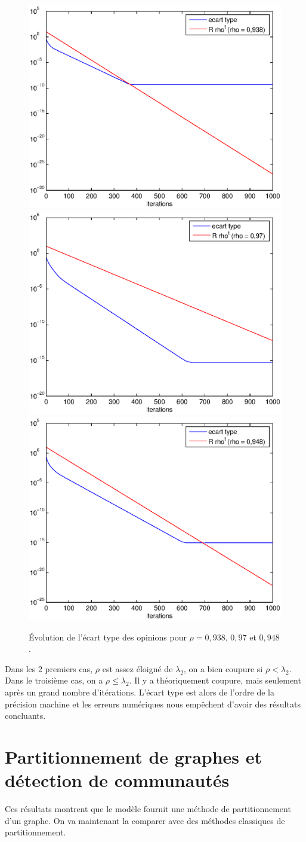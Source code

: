 \documentclass[12pt]{article}
\begin{document}
\begin{figure}[htb]
	\begin{center}
		\includegraphics[width=.4\textwidth]{var_rho_0938}
		\includegraphics[width=.4\textwidth]{var_rho_097}
		\includegraphics[width=.5\textwidth]{var_rho_0948}
		\caption{Évolution de l'écart type des opinions pour
                  $\rho = 0,938$, $0,97$ et $0,948$.}
		\label{num_coupure}
	\end{center}
\end{figure}

Dans les 2 premiers cas, $\rho$ est assez éloigné de $\lambda_2$, on a
bien coupure si $\rho < \lambda_2$.  Dans le troisième cas, on a $\rho
\leq \lambda_2$. Il y a théoriquement coupure, mais seulement après un
grand nombre d'itérations. L'écart type est alors de l'ordre de la
précision machine et les erreurs numériques nous empêchent d'avoir des
résultats concluants.

\section{Partitionnement de graphes et détection de communautés}
Ces résultats montrent que le modèle fournit une méthode de
partitionnement d'un graphe. On va maintenant la comparer avec des
méthodes classiques de partitionnement.
\end{document}
